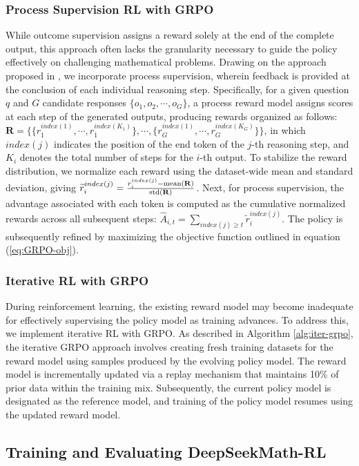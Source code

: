 \begin{itemize}[topsep=0pt]
\begin{itemize}[topsep=0pt]
\subsubsection{Process Supervision RL with GRPO} While outcome supervision assigns a reward solely at the end of the complete output, this approach often lacks the granularity necessary to guide the policy effectively on challenging mathematical problems. Drawing on the approach proposed in \cite{wang2023math}, we incorporate process supervision, wherein feedback is provided at the conclusion of each individual reasoning step. Specifically, for a given question $q$ and $G$ candidate responses $\{o_1, o_2, \cdots, o_G\}$, a process reward model assigns scores at each step of the generated outputs, producing rewards organized as follows: $\mathbf{R} = \{ \{r_1^{index(1)},\cdots,r_1^{index(K_1)}\}, \cdots,  \{r_G^{index(1)},\cdots,r_G^{index(K_G)}\} \}$, in which $index(j)$ indicates the position of the end token of the $j$-th reasoning step, and $K_i$ denotes the total number of steps for the $i$-th output. To stabilize the reward distribution, we normalize each reward using the dataset-wide mean and standard deviation, giving $\widetilde{r}_i^{index(j)} = \frac{r_i^{index(j)} - {\rm mean(\mathbf{R})}}{{\rm std(\mathbf{R})}}$.
Next, for process supervision, the advantage associated with each token is computed as the cumulative normalized rewards across all subsequent steps: $\hat{A}_{i, t} = \sum_{index(j) \ge t} \widetilde{r}_i^{index(j)}$. The policy is subsequently refined by maximizing the objective function outlined in equation (\ref{eq:GRPO-obj}).

\subsubsection{Iterative RL with GRPO} During reinforcement learning, the existing reward model may become inadequate for effectively supervising the policy model as training advances. To address this, we implement iterative RL with GRPO. As described in Algorithm \ref{alg:iter-grpo}, the iterative GRPO approach involves creating fresh training datasets for the reward model using samples produced by the evolving policy model. The reward model is incrementally updated via a replay mechanism that maintains 10\% of prior data within the training mix. Subsequently, the current policy model is designated as the reference model, and training of the policy model resumes using the updated reward model.

\subsection{Training and Evaluating DeepSeekMath-RL}


\end{itemize}
\end{itemize}
